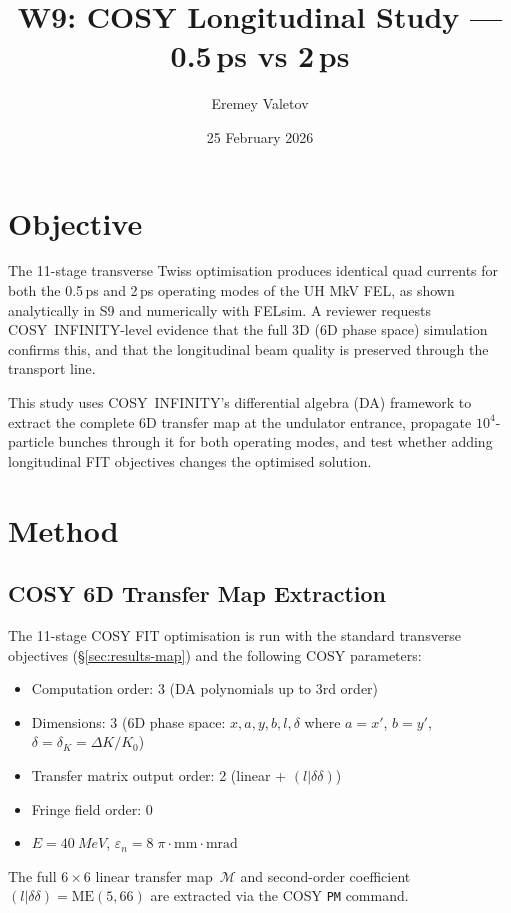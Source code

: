 \documentclass[11pt]{article}
\title{W9: COSY Longitudinal Study --- 0.5\,ps vs 2\,ps}
\author{Eremey Valetov}
\date{25 February 2026}
\begin{document}
\maketitle

\section{Objective}

The 11-stage transverse Twiss optimisation produces identical quad currents
for both the 0.5\,ps and 2\,ps operating modes of the UH MkV FEL, as shown
analytically in S9 and numerically with FELsim.  A reviewer requests
COSY~INFINITY-level evidence that the full 3D (6D phase space) simulation
confirms this, and that the longitudinal beam quality is preserved through
the transport line.

This study uses COSY~INFINITY's differential algebra (DA) framework to
extract the complete 6D transfer map at the undulator entrance, propagate
$10^4$-particle bunches through it for both operating modes, and test
whether adding longitudinal FIT objectives changes the optimised solution.


\section{Method}

\subsection{COSY 6D Transfer Map Extraction}

The 11-stage COSY FIT optimisation is run with the standard transverse
objectives (\S\ref{sec:results-map}) and the following COSY parameters:
\begin{itemize}
  \item Computation order: 3 (DA polynomials up to 3rd order)
  \item Dimensions: 3 (6D phase space: $x, a, y, b, l, \delta$
    where $a = x'$, $b = y'$, $\delta = \delta_K = \Delta K/K_0$)
  \item Transfer matrix output order: 2 (linear + $(l|\delta\delta)$)
  \item Fringe field order: 0
  \item $E = \SI{40}{MeV}$, $\varepsilon_n = 8\;\pi\cdot\text{mm}\cdot\text{mrad}$
\end{itemize}

The full $6\times6$ linear transfer map~$\mathcal{M}$ and second-order
coefficient $(l|\delta\delta) = \text{ME}(5,66)$ are extracted via the COSY
\texttt{PM} command.
\end{document}
